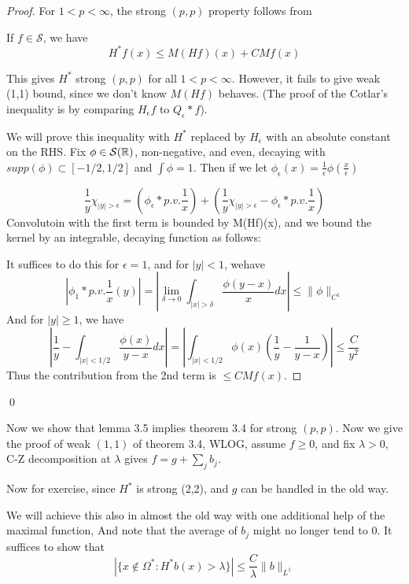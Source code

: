 \begin{proof}
    For $1<p<\infty$, the strong $(p,p)$ property follows from
    \begin{lemma}
        If $f\in\mathcal{S}$, we have
        \begin{equation*}
            H^* f(x)\leq M(Hf)(x)+CMf(x)
        \end{equation*}
    \end{lemma}
    This gives $H^*$ strong $(p,p)$ for all $1<p<\infty$. However, it fails to give weak (1,1) bound, since we don't know $M(Hf)$ behaves. (The proof of the Cotlar's inequality is by comparing $H_\epsilon f$ to $Q_\epsilon\ast f$).

    We will prove this inequality with $H^*$ replaced by $H_\epsilon$ with an absolute constant on the RHS. Fix $\phi\in\mathcal{S}(\mathbb{R})$, non-negative, and even, decaying with $supp(\phi)\subset [-1/2, 1/2]$ and $\int\phi=1$. Then if we let $\phi_\epsilon(x)=\frac{1}{\epsilon}\phi\left(\frac{x}{\epsilon}\right)$

    \begin{equation*}
        \frac{1}{y}\chi_{|y|>\epsilon}=(\phi_\epsilon\ast p.v.\frac{1}{x})+\left(\frac{1}{y}\chi_{|y|>\epsilon}-\phi_\epsilon\ast p.v.\frac{1}{x}\right)
    \end{equation*}
    Convolutoin with the first term is bounded by M(Hf)(x), and we bound the kernel by an integrable, decaying function as follows:

    It suffices to do this for $\epsilon=1$, and for $|y|<1$, wehave
    \begin{equation*}
        |\phi_1\ast p.v.\frac{1}{x}(y)|=\left|\lim_{\delta\to 0}\int_{|x|>\delta}\frac{\phi(y-x)}{x}dx\right|\leq\|\phi\|_{C^1}
    \end{equation*}
    And for $|y|\geq 1$, we have
    \begin{equation*}
        \left|\frac{1}{y}-\int_{|x|<1/2}\frac{\phi(x)}{y-x}dx\right|=\left|\int_{|x|<1/2}\phi(x)\left(\frac{1}{y}-\frac{1}{y-x}\right) \right|\leq\frac{C}{y^2}
    \end{equation*}
    Thus the contribution from the 2nd term is $\leq CMf(x)$.
    
\end{proof}
\qed

Now we show that lemma 3.5 implies theorem 3.4 for strong $(p,p)$. Now we give the proof of weak $(1,1)$ of theorem 3.4, WLOG, assume $f\geq 0$, and fix $\lambda>0$, C-Z decomposition at $\lambda$ gives $f=g+\sum_jb_j$.

Now for exercise, since $H^*$ is strong (2,2), and $g$ can be handled in the old way.
\begin{note}
    We will achieve this also in almost the old way with one additional help of the maximal function, And note that the average of $b_j$ might no longer tend to 0.
    It suffices to show that 
    \begin{equation*}
        |\{x\not\in\Omega^*: H^*b(x)>\lambda\}|\leq\frac{C}{\lambda}\|b\|_{L^1}
    \end{equation*}
\end{note}

